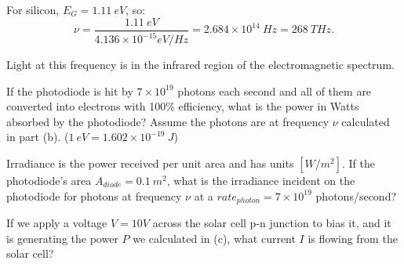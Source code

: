 \begin{enumerate}
{	For silicon, $E_G = 1.11~eV$, so:
	\begin{equation}
	\nu = \frac{1.11~eV}{4.136\times10^{-15} eV/Hz} = 2.684\times10^{14}~Hz = 268 ~THz.
	\end{equation}
	
	Light at this frequency is in the infrared region of the electromagnetic spectrum.
	
}
	
	\qitem If the photodiode is hit by $7\times10^{19}$ photons each second  and all of them are converted into electrons with 100\% efficiency, what is the power in Watts absorbed by the photodiode? Assume the photons are at frequency $\nu$ calculated in part (b). ($1~eV = 1.602\times10^{-19}~J$)
	

	\qitem Irradiance is the power received per unit area and has units $[W/m^2]$. If the photodiode's area $A_{diode} = 0.1~m^2$, what is the irradiance incident on the photodiode for photons at frequency $\nu$ at a $rate_{photon} = 7\times10^{19}$ photons/second?
	
	
	\iffalse
	\qitem If we apply a voltage $V = 10V$ across the solar cell p-n junction to bias it, and it is generating the power $P$ we calculated in (c), what current $I$ is flowing from the solar cell?
	

\end{enumerate}
